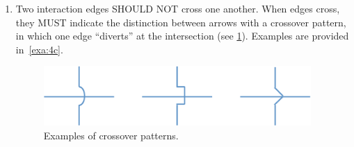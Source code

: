 \begin{enumerate}
\item Two interaction edges SHOULD NOT cross one another.  When edges cross, they MUST indicate the distinction between arrows with a crossover pattern, in which one edge ``diverts'' at the intersection (see \ref{f:crossover}).
Examples are provided in~\ref{exa:4c}.

	\begin{figure}[h!]
	\centering
	\includegraphics[width=4in]{figures/crossovers.pdf}
	\caption{Examples of  crossover patterns.}
	\label{f:crossover}
	\end{figure}
	

\end{enumerate}
